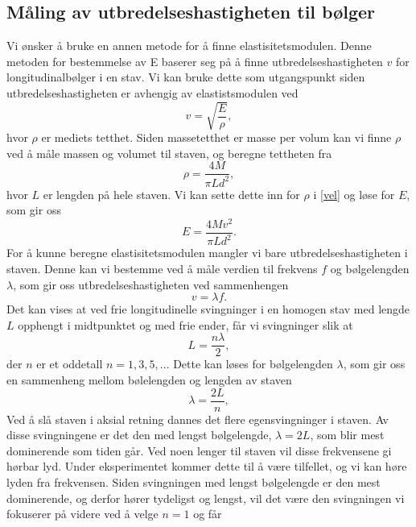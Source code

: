 \documentclass[%
 reprint,
 amsmath,amssymb,
 aps,
 norsk,
 booktabs
]{revtex4-1}
\begin{document}
\subsection{Måling av utbredelseshastigheten til bølger}
Vi ønsker å bruke en annen metode for å finne elastisitetsmodulen. Denne metoden for bestemmelse av E baserer seg på å finne utbredelseshastigheten $v$ for longitudinalbølger i en stav. Vi kan bruke dette som utgangspunkt siden utbredelseshastigheten er avhengig av elastistsmodulen ved
\begin{equation}
  v = \sqrt{\frac{E}{\rho}},\label{vel}
\end{equation}
hvor $\rho$ er mediets tetthet. Siden massetetthet er masse per volum kan vi finne $\rho$ ved å måle massen og volumet til staven, og beregne tettheten fra
\begin{equation*}
  \rho = \frac{4M}{\pi L d^2},
\end{equation*}
hvor $L$ er lengden på hele staven. Vi kan sette dette inn for $\rho$ i \eqref{vel} og løse for $E$, som gir oss
\begin{equation}
  E = \frac{4Mv^2}{\pi L d^2}.\label{elast}
\end{equation}
For å kunne beregne elastisitetsmodulen mangler vi bare utbredelseshastigheten i staven. Denne kan vi bestemme ved å måle verdien til frekvens $f$ og bølgelengden $\lambda$, som gir oss utbredelseshastigheten ved sammenhengen
\begin{equation}
  v = \lambda f.\label{vlf}
\end{equation}
Det kan vises at ved frie longitudinelle svingninger i en homogen stav med lengde $L$ opphengt i midtpunktet og med frie ender, får vi svingninger slik at
\begin{equation*}
  L = \frac{n\lambda}{2},
\end{equation*}
der $n$ er et oddetall $n = 1, 3, 5, \ldots$ Dette kan løses for bølgelengden $\lambda$, som gir oss en sammenheng mellom bølelengden og lengden av staven
\begin{equation*}
  \lambda = \frac{2L}{n},
\end{equation*}
Ved å slå staven i aksial retning dannes det flere egensvingninger i staven. Av disse svingningene er det den med lengst bølgelengde, $\lambda = 2L$, som blir mest dominerende som tiden går. Ved noen lenger til staven vil disse frekvensene gi hørbar lyd. Under eksperimentet kommer dette til å være tilfellet, og vi kan høre lyden fra frekvensen. Siden svingningen med lengst bølgelengde er den mest dominerende, og derfor hører tydeligst og lengst, vil det være den svingningen vi fokuserer på videre ved å velge $n=1$ og får
\end{document}
